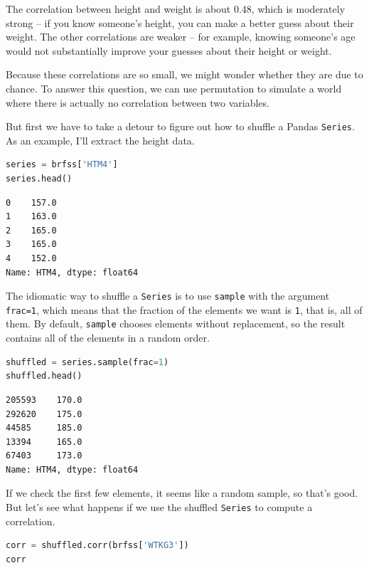 The correlation between height and weight is about 0.48, which is
moderately strong -- if you know someone's height, you can make a better
guess about their weight. The other correlations are weaker -- for
example, knowing someone's age would not substantially improve your
guesses about their height or weight.

Because these correlations are so small, we might wonder whether they
are due to chance. To answer this question, we can use permutation to
simulate a world where there is actually no correlation between two
variables.

But first we have to take a detour to figure out how to shuffle a Pandas
\passthrough{\lstinline!Series!}. As an example, I'll extract the height
data.

\begin{lstlisting}[language=Python,style=source]
series = brfss['HTM4']
series.head()
\end{lstlisting}

\begin{lstlisting}[style=output]
0    157.0
1    163.0
2    165.0
3    165.0
4    152.0
Name: HTM4, dtype: float64
\end{lstlisting}

The idiomatic way to shuffle a \passthrough{\lstinline!Series!} is to
use \passthrough{\lstinline!sample!} with the argument
\passthrough{\lstinline!frac=1!}, which means that the fraction of the
elements we want is \passthrough{\lstinline!1!}, that is, all of them.
By default, \passthrough{\lstinline!sample!} chooses elements without
replacement, so the result contains all of the elements in a random
order.

\begin{lstlisting}[language=Python,style=source]
shuffled = series.sample(frac=1)
shuffled.head()
\end{lstlisting}

\begin{lstlisting}[style=output]
205593    170.0
292620    175.0
44585     185.0
13394     165.0
67403     173.0
Name: HTM4, dtype: float64
\end{lstlisting}

If we check the first few elements, it seems like a random sample, so
that's good. But let's see what happens if we use the shuffled
\passthrough{\lstinline!Series!} to compute a correlation.

\begin{lstlisting}[language=Python,style=source]
corr = shuffled.corr(brfss['WTKG3'])
corr
\end{lstlisting}

